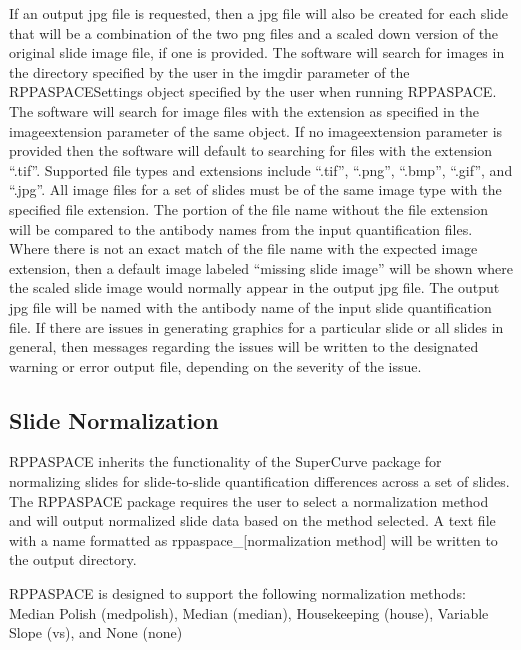 \documentclass[
]{article}
\begin{document}
If an output jpg file is requested, then a jpg file will also be created
for each slide that will be a combination of the two png files and a
scaled down version of the original slide image file, if one is
provided. The software will search for images in the directory specified
by the user in the imgdir parameter of the RPPASPACESettings object
specified by the user when running RPPASPACE. The software will search
for image files with the extension as specified in the imageextension
parameter of the same object. If no imageextension parameter is provided
then the software will default to searching for files with the extension
``.tif''. Supported file types and extensions include ``.tif'',
``.png'', ``.bmp'', ``.gif'', and ``.jpg''. All image files for a set of
slides must be of the same image type with the specified file extension.
The portion of the file name without the file extension will be compared
to the antibody names from the input quantification files. Where there
is not an exact match of the file name with the expected image
extension, then a default image labeled ``missing slide image'' will be
shown where the scaled slide image would normally appear in the output
jpg file. The output jpg file will be named with the antibody name of
the input slide quantification file. If there are issues in generating
graphics for a particular slide or all slides in general, then messages
regarding the issues will be written to the designated warning or error
output file, depending on the severity of the issue.

\newpage

\hypertarget{process_7}{%
\subsection{Slide Normalization}\label{process_7}}

RPPASPACE inherits the functionality of the SuperCurve package for
normalizing slides for slide-to-slide quantification differences across
a set of slides. The RPPASPACE package requires the user to select a
normalization method and will output normalized slide data based on the
method selected. A text file with a name formatted as
rppaspace\_{[}normalization method{]} will be written to the output
directory.

RPPASPACE is designed to support the following normalization methods:
Median Polish (medpolish), Median (median), Housekeeping (house),
Variable Slope (vs), and None (none)
\end{document}
